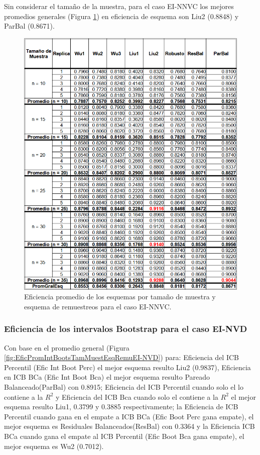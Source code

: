 Sin considerar el tamaño de la muestra, para el caso EI-NNVC los mejores promedios generales (Figura \ref{fig:EficPromEsqTamMuesEsqRemuEI-NNVC})  en eficiencia de esquema son Liu2 (0.8848) y ParBal (0.8671).


\begin{figure}[ht] 
	\centering 
	\includegraphics[width=0.70\linewidth]{img/EI_NNVC_Efic_Esq.png} 
	\caption{Eficiencia promedio de los esquemas por tamaño de muestra y esquema de remuestreos para el caso EI-NNVC.} 
	\label{fig:EficPromEsqTamMuesEsqRemuEI-NNVC}
\end{figure}
\FloatBarrier


\subsubsection{Eficiencia de los intervalos Bootstrap para el caso EI-NVD}
Con base en el promedio general  (Figura \ref{fig:EficPromIntBootsTamMuestEsqRemuEI-NVD}) para: Eficiencia del ICB Percentil (Efic Int Boot Perc) el mejor esquema resulto Liu2 (0.9837), Eficiencia en ICB BCa (Efic Int Boot Bca) el mejor esquema resulto Pareado Balanceado(ParBal) con 0.8915; Eficiencia del ICB Percentil cuando solo el lo contiene a la $R^{2}$ y Eficiencia del ICB Bca cuando solo el contiene a la $R^{2}$ el mejor esquema resulto Liu1, 0.3799 y 0.3885 respectivamente; la Eficiencia de ICB Percentil cuando gana en el empate a ICB BCa (Efic Boot Perc gana empate), el mejor esquema es Residuales Balanceados(ResBal) con 0.3364 y la Eficiencia ICB BCa cuando gana el empate al ICB Percentil (Efic Boot Bca gana empate), el mejor esquema es Wu2 (0.7012).
\vspace{.5cm}


